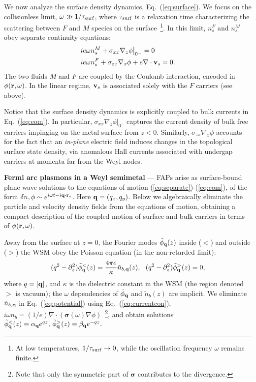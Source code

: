 \documentclass[aps,twocolumn,prl,groupedaddress]{revtex4}
\newcommand{\be}{\begin{equation}}
\newcommand{\ee}{\end{equation}}
\newcommand{\bea}{\begin{eqnarray}}
\newcommand{\eea}{\end{eqnarray}}
\renewcommand{\vec}[1]{{\bf #1}}
\begin{document}
We now analyze the surface density dynamics, Eq.~(\ref{eq:surface}).
We focus on the collisionless limit, $\omega \gg 1/\tau_{\rm surf}$, where $\tau_{\rm surf}$ is a relaxation time characterizing the
scattering between $F$ and $M$ species on the surface~\footnote{At low temperatures, $1/\tau_{\rm surf} \to 0$, while the oscillation frequency $\omega$ remains finite.}. 
In this limit, $n_s^F$ and $n_s^M$ 
obey separate continuity equations: 
\bea
\nonumber &ie\omega n_s^M + \sigma_{xx} \nabla_z \phi \big|_{0^-}=0\\
&ie\omega n_s^F+  \sigma_{zx}\nabla_x \phi+ e\nabla \cdot \vec v_s = 0.
\label{eq:eom}
\eea
The two fluids $M$ and $F$ are coupled by the Coulomb interaction, encoded 
in $\phi (\vec r, \omega)$.
In the linear regime, $\vec v_s$ is associated solely with the $F$ carriers (see above).

Notice that the surface density dynamics is explicitly coupled to bulk currents in Eq.~(\ref{eq:eom}). 
In particular,  
$\sigma_{xx}\nabla_z\phi\big|_{0^-}$ 
captures the current density of bulk free carriers impinging on the metal surface from $z < 0$.
Similarly, $\sigma_{zx} \nabla_x \phi$ accounts for the fact that an {\it in-plane} electric field induces changes in the topological surface state density, via anomalous Hall currents associated with undergap carriers at momenta far from the Weyl nodes.

\vspace{2mm}
{\bf Fermi arc plasmons in a Weyl semimetal} --- 
FAPs arise as surface-bound plane wave solutions to the equations of motion (\ref{eq:separate})-(\ref{eq:eom}), of the form $\delta n, \phi \sim e^{i\omega t-i \vec{q}\cdot \vec{r}_s}$.  
Here $\vec{q} = (q_x, q_y)$. 
Below we algebraically eliminate the particle and velocity density fields from the equations of motion, obtaining a compact description of the coupled motion of surface and bulk carriers in terms of $\phi(\vec r,\omega)$.

Away from the surface at $z = 0$, 
the Fourier modes $\tilde{\phi}_{\vec{q}}(z)$ inside ($<$) and outside ($>$) the WSM obey the Poisson equation (in the non-retarded limit): 
\be
(q^2 - \partial_z^2) \tilde{\phi}_{\vec{q}}^<(z) =  \frac{4\pi e}{\kappa} \tilde{n}_{b, \vec{q}}(z),\ \ (q^2 - \partial_z^2) \tilde{\phi}_{\vec{q}}^>(z) =0,
\label{eq:potential}
\ee
where $q = |\vec{q}|$, and $\kappa$ is the dielectric constant in the WSM (the region denoted $>$ is vacuum); the $\omega$ dependencies of $\tilde{\phi}_{\vec{q}}$ and $\tilde{n}_{b}(z)$ are implicit. We eliminate $\tilde{n}_{b,\vec{q}}$ in Eq.~(\ref{eq:potential}) using Eq.~(\ref{eq:currentcon}), $i\omega {n}_b = (1/e)\nabla\cdot({\bm \sigma}(\omega)\nabla\phi)$~\footnote{Note that only the symmetric part of $\bm{\sigma}$ contributes to the divergence.}, and obtain solutions $
\tilde{\phi}_{\vec{q}}^<(z) = \alpha_{\vec{q}} e^{qz}, \, \tilde{\phi}_{\vec{q}}^> (z) = \beta_{\vec{q}} e^{-qz}.
\label{eq:phi}
$
\end{document}
